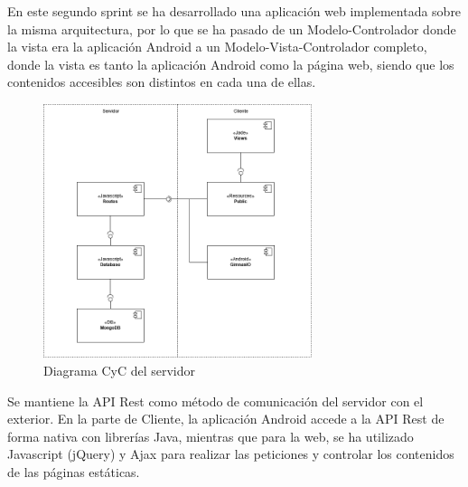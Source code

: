 \documentclass[11pt,a4paper]{report}
\begin{document}
En este segundo sprint se ha desarrollado una aplicación web implementada sobre la misma arquitectura, por lo que se ha pasado de un Modelo-Controlador donde la vista era la aplicación Android a un Modelo-Vista-Controlador completo, donde la vista es tanto la aplicación Android como la página web, siendo que los contenidos accesibles son distintos en cada una de ellas.

\begin{figure}[H]
	\centering
	\includegraphics[width=0.7\textwidth]{graficos/CyCserver.png}
	\caption{Diagrama CyC del servidor }
	\label{fig: CyCServ2}
\end{figure}
Se mantiene la API Rest como método de comunicación del servidor con el exterior. En la parte de Cliente, la aplicación Android accede a la API Rest de forma nativa con librerías Java, mientras que para la web, se ha utilizado Javascript (jQuery) y Ajax para realizar las peticiones y controlar los contenidos de las páginas estáticas.
\end{document}
